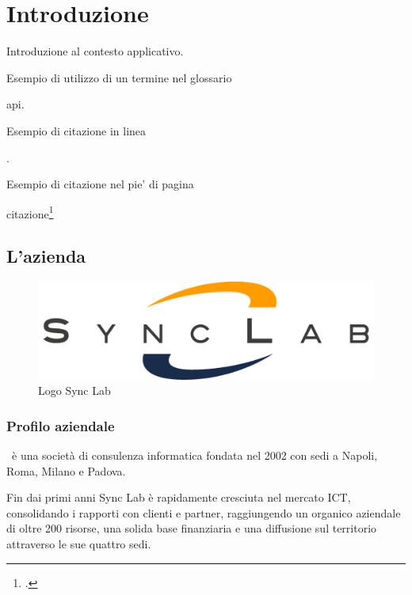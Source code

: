 
\chapter{Introduzione}
\label{cap:introduzione}

Introduzione al contesto applicativo.\bigskip

\noindent Esempio di utilizzo di un termine nel glossario \par
\noindent \gls{api}.\bigskip

\noindent Esempio di citazione in linea \par
\noindent \cite{site:agile-manifesto}. \bigskip

\noindent Esempio di citazione nel pie' di pagina \par
\noindent citazione\footcite{womak:lean-thinking}

\section{L'azienda}

\begin{figure}[H]
	\centering
	\includegraphics[width=\textwidth/2]{immagini/logo-synclab.png}
	\caption{Logo Sync Lab}
\end{figure}

\subsection{Profilo aziendale}
\myCompany\ è una società di consulenza informatica fondata nel 2002 con sedi a Napoli, Roma, Milano e Padova.

Fin dai primi anni Sync Lab è rapidamente cresciuta nel mercato ICT, consolidando i rapporti con clienti e partner, raggiungendo un organico aziendale di oltre 200 risorse,
una solida base finanziaria e una diffusione sul territorio attraverso le sue quattro sedi.

